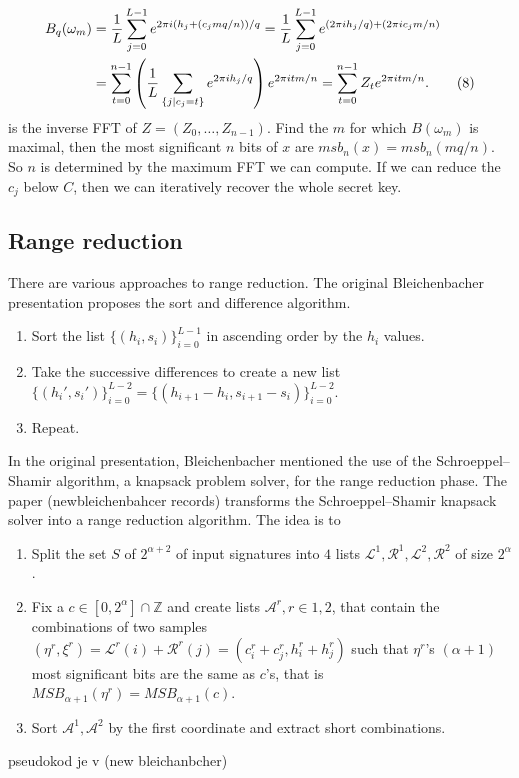 \begin{align}
    B_q(\omega_m) 
    &= \frac{1}{L} \sum_{j=0}^{L-1} e^{2\pi i (h_j + (c_j m q / n))/q} 
    = \frac{1}{L} \sum_{j=0}^{L-1} e^{(2\pi i h_j / q) + (2\pi i c_j m / n)} \notag \\
    &= \sum_{t=0}^{n-1} \left( \frac{1}{L} \sum_{\substack{\{j \mid c_j = t\}}} e^{2\pi i h_j / q} \right) e^{2\pi i t m / n} 
    = \sum_{t=0}^{n-1} Z_t e^{2\pi i t m / n}. \tag{8}
\end{align}
is the inverse FFT of $Z = (Z_0, \ldots, Z_{n-1})$. Find the $m$ for which $B(\omega_m)$ is maximal, then the most significant $n$ bits of $x$ are $msb_n(x) = msb_n(mq/n)$. So $n$ is determined by the maximum FFT we can compute. If we can reduce the $c_j$ below $C$, then we can iteratively recover the whole secret key.

\subsection{Range reduction}
There are various approaches to range reduction. The original Bleichenbacher presentation proposes the sort and difference algorithm.

\begin{enumerate}
    \item Sort the list $\{(h_i, s_i)\}_{i=0}^{L-1}$ in ascending order by the $h_i$ values.
    \item Take the successive differences to create a new list $\{(h_i', s_i')\}_{i=0}^{L-2} = \{(h_{i+1} - h_i, s_{i+1} - s_i)\}_{i=0}^{L-2}$.
    \item Repeat.
\end{enumerate}

In the original presentation, Bleichenbacher mentioned the use of the Schroeppel–Shamir algorithm, a knapsack problem solver, for the range reduction phase. The paper (newbleichenbahcer records) transforms the Schroeppel–Shamir knapsack solver into a range reduction algorithm. The idea is to 

\begin{enumerate}
    \item Split the set $S$ of $2^{\alpha +2}$ of input signatures into $4$ lists $\mathcal{L}^1, \mathcal{R}^1, \mathcal{L}^2, \mathcal{R}^2$ of size $2^\alpha$.
    \item Fix a $c \in [0,2^\alpha] \cap  \mathbb{Z}$ and create lists $\mathcal{A}^r, r \in 1,2$, that contain the combinations of two samples $(\eta^r, \xi^r) = \mathcal{L}^r(i) + \mathcal{R}^r(j) = (c_i^r + c_j^r, h_i^r + h_j^r)$ such that $\eta^r$'s $(\alpha + 1)$ most significant bits are the same as $c$'s, that is $MSB_{\alpha + 1}(\eta^r) = MSB_{\alpha + 1}(c)$. 
    \item Sort $\mathcal{A}^1, \mathcal{A}^2$ by the first coordinate and extract short combinations.
\end{enumerate}
pseudokod je v (new bleichanbcher)









